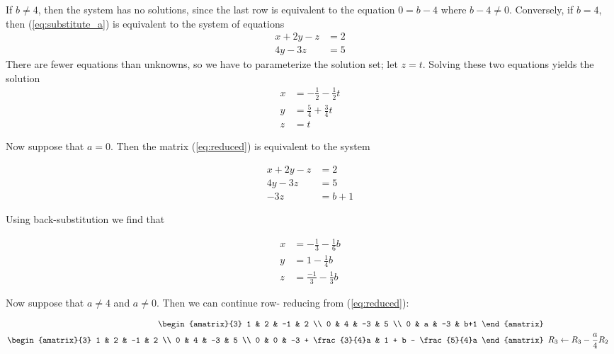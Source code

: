 \documentclass{article}
\begin{document}
\begin{enumerate}
If $b \neq 4$, then the system has no solutions, since the last row is
equivalent to the equation $0 = b-4$ where $b-4 \neq 0$.  Conversely, if
$b = 4$, then (\ref{eq:substitute_a}) is equivalent to the system of
equations
\begin{align*}
 x + 2y -z &= 2 \\
 4y - 3z &= 5
\end{align*}
There are fewer equations than unknowns, so we have to parameterize the
solution set; let $z = t$.  Solving these two equations yields the solution
\begin{equation}\begin{aligned}
 x &= -\frac{1}{2} - \frac{1}{2}t \\
 y &= \frac{5}{4} + \frac{3}{4}t \\
 z &= t
\end{aligned}\label{q4:inf}\end{equation}

Now suppose that $a = 0$.  Then the matrix (\ref{eq:reduced}) is equivalent
to the system

\begin{align*}
 x + 2y -z &= 2 \\
 4y -3z &= 5 \\
 -3z &= b+1
\end{align*}

Using back-substitution we find that

\begin{equation}\begin{aligned}
 x &= -\frac{1}{3} - \frac{1}{6}b \\
 y &= 1 - \frac{1}{4}b \\
 z &= \frac{-1}{3} - \frac{1}{3}b
\end{aligned}\label{q4:a_zero}\end{equation}

Now suppose that $a \neq 4$ and $a \neq 0$.  Then we can continue row-
reducing from (\ref{eq:reduced}):

\begin{align}
 \begin{amatrix}{3}
  1 & 2 & -1 &   2 \\
  0 & 4 & -3 &   5 \\
  0 & a & -3 & b+1
 \end{amatrix} &
 \nonumber \\
 \begin{amatrix}{3}
  1 & 2 & -1 & 2 \\
  0 & 4 & -3 & 5 \\
  0 & 0 & -3 + \frac{3}{4}a & 1 + b - \frac{5}{4}a
 \end{amatrix}&
 \begin{array}{l}
  R_3 \leftarrow R_3 - \dfrac{a}{4}R_2
 \end{array} 
 \nonumber
\end{align}


\end{enumerate}
\end{document}
